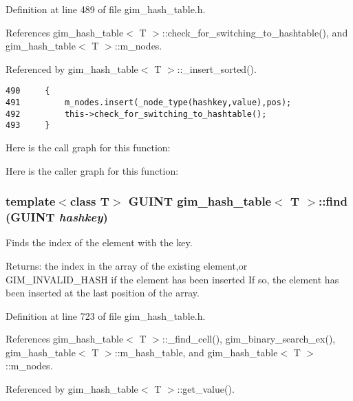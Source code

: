 Definition at line 489 of file gim\_\-hash\_\-table.h.

References gim\_\-hash\_\-table$<$ T $>$::check\_\-for\_\-switching\_\-to\_\-hashtable(), and gim\_\-hash\_\-table$<$ T $>$::m\_\-nodes.

Referenced by gim\_\-hash\_\-table$<$ T $>$::\_\-insert\_\-sorted().

\begin{Code}\begin{verbatim}490     {
491         m_nodes.insert(_node_type(hashkey,value),pos);
492         this->check_for_switching_to_hashtable();
493     }
\end{verbatim}
\end{Code}




Here is the call graph for this function:

Here is the caller graph for this function:\hypertarget{classgim__hash__table_14261b2d7de34188f8bc5179e4d60760}{
\subsubsection[find]{\setlength{\rightskip}{0pt plus 5cm}template$<$class T$>$ GUINT {\bf gim\_\-hash\_\-table}$<$ T $>$::find (GUINT {\em hashkey})}}
\label{classgim__hash__table_14261b2d7de34188f8bc5179e4d60760}


Finds the index of the element with the key. 

\begin{Desc}
\item[Returns:]the index in the array of the existing element,or GIM\_\-INVALID\_\-HASH if the element has been inserted If so, the element has been inserted at the last position of the array. \end{Desc}


Definition at line 723 of file gim\_\-hash\_\-table.h.

References gim\_\-hash\_\-table$<$ T $>$::\_\-find\_\-cell(), gim\_\-binary\_\-search\_\-ex(), gim\_\-hash\_\-table$<$ T $>$::m\_\-hash\_\-table, and gim\_\-hash\_\-table$<$ T $>$::m\_\-nodes.

Referenced by gim\_\-hash\_\-table$<$ T $>$::get\_\-value().

